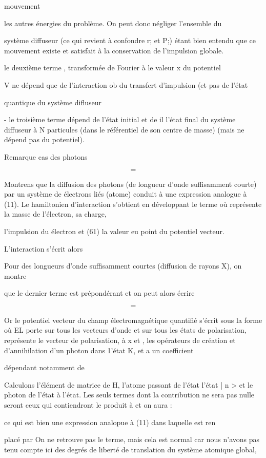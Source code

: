 {{{mouvement

les autres énergies du problème. On peut donc négliger l'ensemble du

système diffuseur (ce qui revient à confondre r; et P;) étant bien entendu
que ce mouvement existe et satisfait à la conservation de l'impulsion globale.

 le deuxième terme , transformée de Fourier à le valeur x du potentiel

V ne dépend que de l'interaction ob du transfert d'impulsion (et pas de l'état

quantique du système difluseur

- le troisième terme  dépend de l'état initial et de
il
l'état final du système diffuseur à N particules (dans le référentiel de son
centre de masse) (mais ne dépend pas du potentiel).

Remarque  cas des photons

\[
\tag{115}=
\]

Montrens que la diffusion des photons (de longueur d'onde suffisamment courte) par
un système de  électrons liés (atome) conduit à une expression analogue à (11).
Le hamiltonien d'interaction s'obtient en développant le terme
 où  représente la masse de l'électron,  sa charge, 

l'impulsion du électron et  (61) la valeur eu point  du potentiel
vecteur.

L'interaction s'écrit alors

Pour des longueurs d'onde suffisamment courtes (diffusion de rayons X), on montre

que le dernier terme est prépondérant et on peut alors écrire

\[
\tag{116}=
\]


Or le potentiel vecteur du champ électromagnétique quantifié s'écrit sous
la forme
où EL porte sur tous les vecteurs d'onde et  sur tous les états de polarisation,
représente le vecteur de polarisation, à x et , les opérateurs
de création et d'annihilation d'un photon dans 1'état K,  et a un coefficient

dépendant notamment de 

Calculons l'élément de matrice de H, l'atome passant de l'état
l'état | n > et le photon de l'état  à l'état.
Les seuls termes dont la contribution ne sera pas nulle seront ceux qui contiendront
le produit  à et on aura :

ce qui est bien une expression analopue à (11) dans laquelle  est ren

placé par On ne retrouve pas le terme, mais cela est
normal car nous n'avons pas tenu compte ici des degrés de liberté de translation
du système atomique global,

}}}
